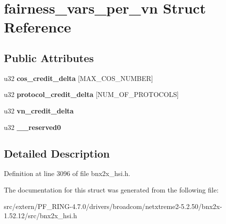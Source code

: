 \hypertarget{structfairness__vars__per__vn}{
\section{fairness\_\-vars\_\-per\_\-vn Struct Reference}
\label{structfairness__vars__per__vn}
}
\subsection*{Public Attributes}
\begin{DoxyCompactItemize}
\item 
\hypertarget{structfairness__vars__per__vn_a1823e77d72a36fcbb73741d0fb487cd5}{
u32 {\bfseries cos\_\-credit\_\-delta} \mbox{[}MAX\_\-COS\_\-NUMBER\mbox{]}}
\label{structfairness__vars__per__vn_a1823e77d72a36fcbb73741d0fb487cd5}

\item 
\hypertarget{structfairness__vars__per__vn_adf02b4296348418c751af56cd9011e91}{
u32 {\bfseries protocol\_\-credit\_\-delta} \mbox{[}NUM\_\-OF\_\-PROTOCOLS\mbox{]}}
\label{structfairness__vars__per__vn_adf02b4296348418c751af56cd9011e91}

\item 
\hypertarget{structfairness__vars__per__vn_ad7e9a31efec3361309902b06ae3d2266}{
u32 {\bfseries vn\_\-credit\_\-delta}}
\label{structfairness__vars__per__vn_ad7e9a31efec3361309902b06ae3d2266}

\item 
\hypertarget{structfairness__vars__per__vn_aeba5b79eb9ef09ea88d16a16da8aef27}{
u32 {\bfseries \_\-\_\-reserved0}}
\label{structfairness__vars__per__vn_aeba5b79eb9ef09ea88d16a16da8aef27}

\end{DoxyCompactItemize}


\subsection{Detailed Description}


Definition at line 3096 of file bnx2x\_\-hsi.h.



The documentation for this struct was generated from the following file:\begin{DoxyCompactItemize}
\item 
src/extern/PF\_\-RING-\/4.7.0/drivers/broadcom/netxtreme2-\/5.2.50/bnx2x-\/1.52.12/src/bnx2x\_\-hsi.h\end{DoxyCompactItemize}
